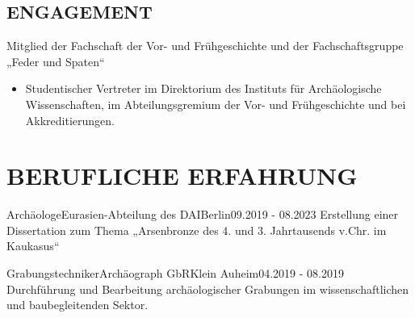 \documentclass[10pt, a4paper]{article}
\begin{document}
\subsection{ENGAGEMENT}

Mitglied der Fachschaft der Vor- und Frühgeschichte und der Fachschaftsgruppe „Feder und Spaten“

\begin{itemize}
	\item Studentischer Vertreter im Direktorium des Instituts für Archäologische Wissenschaften, im Abteilungsgremium der Vor- und Frühgeschichte und bei Akkreditierungen.
\end{itemize}

\switchcols %

\section{BERUFLICHE ERFAHRUNG}


\begin{cvitem}{Archäologe}{Eurasien-Abteilung des DAI}{Berlin}{09.2019 - 08.2023}
Erstellung einer Dissertation zum Thema „Arsenbronze des 4. und 3. Jahrtausends v.Chr. im Kaukasus“

\end{cvitem}

\begin{cvitem}{Grabungstechniker}{Archäograph GbR}{Klein Auheim}{04.2019 - 08.2019}
	Durchführung und Bearbeitung archäologischer Grabungen im wissenschaftlichen und baubegleitenden Sektor.
	
\end{cvitem}
\end{document}
